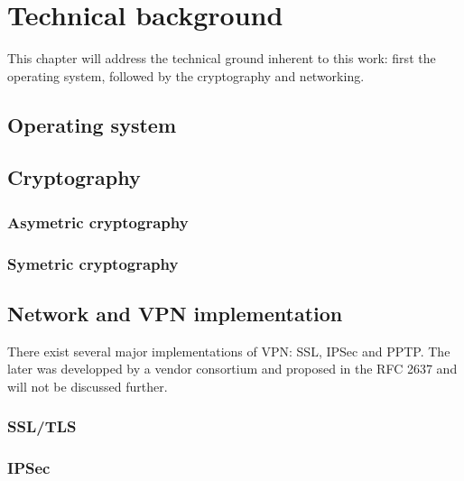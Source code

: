 \chapter{Technical background}

This chapter will address the technical ground inherent to this work: first the operating system, followed by the cryptography and networking.

\section{Operating system}

\section{Cryptography}

\subsection{Asymetric cryptography}

\subsection{Symetric cryptography}

\section{Network and VPN implementation}



There exist several major implementations of VPN: SSL, IPSec and PPTP.
The later was developped by a vendor consortium and proposed in the RFC 2637 and will not be discussed further.

\subsection{SSL/TLS}

\subsection{IPSec}
